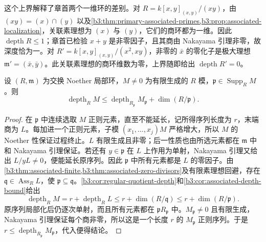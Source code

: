 这个上界解释了章首两个一维环的差别。对 \(R=k[x,y]_{(x,y)}/(xy)\)，由 \((xy)=(x)\cap(y)\) 以及\cref{b3:thm:primary-associated-primes,b3:prop:associated-localization}，关联素理想为 \((x)\) 与 \((y)\)，它们的商环都为一维。因此 \(\operatorname{depth}R\le1\)；章首已检验 \(x+y\) 是非零因子，且其商由 Nakayama 引理非零，故深度恰为一。对 \(R'=k[x,y]_{(x,y)}/(x^2,xy)\)，非零的 \(\bar x\) 的零化子是极大理想 \(\mathfrak m'=(\bar x,\bar y)\)。此关联素理想的商环维数为零，上界随即给出 \(\operatorname{depth}R'=0\)。

\begin{theorem}\label{b3:thm:depth-localization}
	设 \((R,\mathfrak m)\) 为交换 Noether 局部环，\(M\ne0\) 为有限生成的 \(R\) 模，\(\mathfrak p\in\operatorname{Supp}_RM\)。则
	\[
		\operatorname{depth}_RM \le\operatorname{depth}_{R_{\mathfrak p}}M_{\mathfrak p} +\dim(R/\mathfrak p).
	\]
\end{theorem}
\begin{proof}
	在 \(\mathfrak p\) 中连续选取 \(M\) 正则元素，直至不能延长，记所得序列长度为 \(r\)，末端商为 \(L\)。每加进一个正则元素，子模 \((x_1,\ldots,x_j)M\) 严格增大，所以 \(M\) 的 Noether 性保证过程终止。\(L\) 有限生成且非零；后一性质也由所选元素都在 \(\mathfrak m\) 中和 Nakayama 引理保证。若还有 \(y\in\mathfrak p\) 在 \(L\) 上作用为单射，Nakayama 引理又给出 \(L/yL\ne0\)，便能延长原序列。因此 \(\mathfrak p\) 中所有元素都是 \(L\) 的零因子。由\cref{b3:thm:associated-finite,b3:thm:associated-zero-divisors}及有限素理想回避，存在 \(\mathfrak q\in\operatorname{Ass}_RL\)，使 \(\mathfrak p\subseteq\mathfrak q\)。\cref{b3:cor:regular-quotient-depth}和\cref{b3:cor:associated-depth-bound}给出
	\[
		\operatorname{depth}_RM=r+\operatorname{depth}_RL \le r+\dim(R/\mathfrak q)\le r+\dim(R/\mathfrak p).
	\]
	原序列局部化后仍逐次单射，而且所有元素都在 \(\mathfrak pR_{\mathfrak p}\) 中。\(M_{\mathfrak p}\ne0\) 且有限生成，Nakayama 引理保证每个商非零，所以这是一个长度 \(r\) 的 \(M_{\mathfrak p}\) 正则序列。于是 \(r\le\operatorname{depth}_{R_{\mathfrak p}}M_{\mathfrak p}\)，代入便得结论。
\end{proof}

